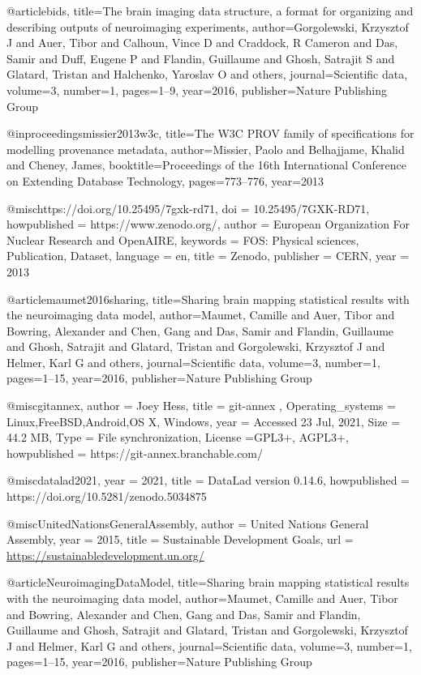@article{bids,
  title={The brain imaging data structure, a format for organizing and describing outputs of neuroimaging experiments},
  author={Gorgolewski, Krzysztof J and Auer, Tibor and Calhoun, Vince D and Craddock, R Cameron and Das, Samir and Duff, Eugene P and Flandin, Guillaume and Ghosh, Satrajit S and Glatard, Tristan and Halchenko, Yaroslav O and others},
  journal={Scientific data},
  volume={3},
  number={1},
  pages={1--9},
  year={2016},
  publisher={Nature Publishing Group}
}


@inproceedings{missier2013w3c,
  title={The W3C PROV family of specifications for modelling provenance metadata},
  author={Missier, Paolo and Belhajjame, Khalid and Cheney, James},
  booktitle={Proceedings of the 16th International Conference on Extending Database Technology},
  pages={773--776},
  year={2013}
}

@misc{https://doi.org/10.25495/7gxk-rd71,
  doi = {10.25495/7GXK-RD71},
  howpublished = {https://www.zenodo.org/},
  author = {{European Organization For Nuclear Research} and {OpenAIRE}},
  keywords = {FOS: Physical sciences, Publication, Dataset},
  language = {en},
  title = {Zenodo},
  publisher = {CERN},
  year = {2013}
}


@article{maumet2016sharing,
  title={Sharing brain mapping statistical results with the neuroimaging data model},
  author={Maumet, Camille and Auer, Tibor and Bowring, Alexander and Chen, Gang and Das, Samir and Flandin, Guillaume and Ghosh, Satrajit and Glatard, Tristan and Gorgolewski, Krzysztof J and Helmer, Karl G and others},
  journal={Scientific data},
  volume={3},
  number={1},
  pages={1--15},
  year={2016},
  publisher={Nature Publishing Group}
}

@misc{gitannex,
 author = {Joey Hess},
 title = { git-annex },
 Operating_systems = {Linux,FreeBSD,Android,OS X, Windows},
 year = {Accessed 23 Jul, 2021},
 Size = {44.2 MB},
 Type = {File synchronization},
 License ={GPL3+, AGPL3+},
 howpublished = {https://git-annex.branchable.com/}
 }
 

@misc{datalad2021,
 year = {2021},
 title = {DataLad version 0.14.6},
 howpublished = {https://doi.org/10.5281/zenodo.5034875}
}


@misc{UnitedNationsGeneralAssembly,
 author = {United Nations General Assembly},
 year = {2015},
 title = {Sustainable Development Goals},
 url = {\url{https://sustainabledevelopment.un.org/}}
}

@article{NeuroimagingDataModel,
  title={Sharing brain mapping statistical results with the neuroimaging data model},
  author={Maumet, Camille and Auer, Tibor and Bowring, Alexander and Chen, Gang and Das, Samir and Flandin, Guillaume and Ghosh, Satrajit and Glatard, Tristan and Gorgolewski, Krzysztof J and Helmer, Karl G and others},
  journal={Scientific data},
  volume={3},
  number={1},
  pages={1--15},
  year={2016},
  publisher={Nature Publishing Group}
}

